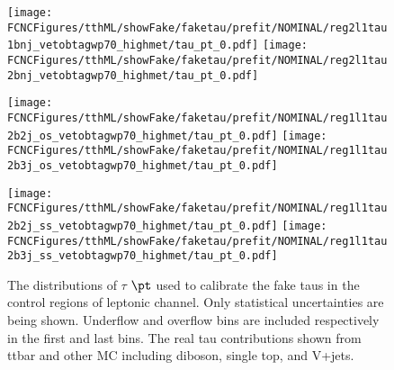 \begin{figure}[H]
\centering
\texttt{[image: \\FCNCFigures/tthML/showFake/faketau/prefit/NOMINAL/reg2l1tau1bnj\_vetobtagwp70\_highmet/tau\_pt\_0.pdf]}
\texttt{[image: \\FCNCFigures/tthML/showFake/faketau/prefit/NOMINAL/reg2l1tau2bnj\_vetobtagwp70\_highmet/tau\_pt\_0.pdf]}

\texttt{[image: \\FCNCFigures/tthML/showFake/faketau/prefit/NOMINAL/reg1l1tau2b2j\_os\_vetobtagwp70\_highmet/tau\_pt\_0.pdf]}
\texttt{[image: \\FCNCFigures/tthML/showFake/faketau/prefit/NOMINAL/reg1l1tau2b3j\_os\_vetobtagwp70\_highmet/tau\_pt\_0.pdf]}

\texttt{[image: \\FCNCFigures/tthML/showFake/faketau/prefit/NOMINAL/reg1l1tau2b2j\_ss\_vetobtagwp70\_highmet/tau\_pt\_0.pdf]}
\texttt{[image: \\FCNCFigures/tthML/showFake/faketau/prefit/NOMINAL/reg1l1tau2b3j\_ss\_vetobtagwp70\_highmet/tau\_pt\_0.pdf]}
\caption{ The distributions of $\tau$ $\pt$ used to calibrate the fake taus in the control regions of leptonic channel. Only statistical uncertainties are being shown. Underflow and overflow bins are included respectively in the first and last bins. The real tau contributions shown from ttbar and other MC including diboson, single top, and V+jets.}
\label{fig:wjet_pt_CR}
\end{figure}
